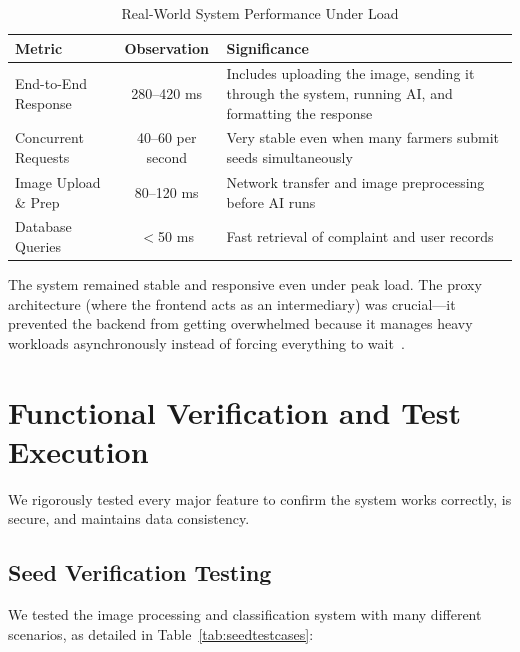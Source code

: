 \begin{table}[htbp]
  \centering
  \caption{Real-World System Performance Under Load}
  \label{tab:backendperformance}
  \renewcommand{\arraystretch}{1.35}
  \begin{tabularx}{\textwidth}{@{} l c X @{}}
    \toprule
    \textbf{Metric} & \textbf{Observation} & \textbf{Significance} \\
    \midrule
    End-to-End Response & 280--420 ms & Includes uploading the image, sending it through the system, running AI, and formatting the response \\
    \addlinespace
    Concurrent Requests & 40--60 per second & Very stable even when many farmers submit seeds simultaneously \\
    \addlinespace
    Image Upload \& Prep & 80--120 ms & Network transfer and image preprocessing before AI runs \\
    \addlinespace
    Database Queries & $<$50 ms & Fast retrieval of complaint and user records \\
    \bottomrule
  \end{tabularx}
\end{table}

The system remained stable and responsive even under peak load. The proxy architecture (where the frontend acts as an intermediary) was crucial—it prevented the backend from getting overwhelmed because it manages heavy workloads asynchronously instead of forcing everything to wait~\cite{martin2018clean}.

\section{Functional Verification and Test Execution}

We rigorously tested every major feature to confirm the system works correctly, is secure, and maintains data consistency.

\subsection{Seed Verification Testing}

We tested the image processing and classification system with many different scenarios, as detailed in Table~\ref{tab:seedtestcases}:


